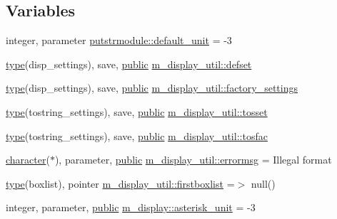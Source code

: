 \subsection*{Variables}
\begin{DoxyCompactItemize}
\item 
integer, parameter \hyperlink{namespaceputstrmodule_a7ec14945bb8449f20f21c0545b1825ee}{putstrmodule\+::default\+\_\+unit} = -\/3
\item 
\hyperlink{stop__watch_83_8txt_a70f0ead91c32e25323c03265aa302c1c}{type}(disp\+\_\+settings), save, \hyperlink{M__stopwatch_83_8txt_a2f74811300c361e53b430611a7d1769f}{public} \hyperlink{namespacem__display__util_a94e5894dfc5e8a59b6ceac6721ae4f8e}{m\+\_\+display\+\_\+util\+::defset}
\item 
\hyperlink{stop__watch_83_8txt_a70f0ead91c32e25323c03265aa302c1c}{type}(disp\+\_\+settings), save, \hyperlink{M__stopwatch_83_8txt_a2f74811300c361e53b430611a7d1769f}{public} \hyperlink{namespacem__display__util_a9ce4a22503d46c3cf4d1a054812827c0}{m\+\_\+display\+\_\+util\+::factory\+\_\+settings}
\item 
\hyperlink{stop__watch_83_8txt_a70f0ead91c32e25323c03265aa302c1c}{type}(tostring\+\_\+settings), save, \hyperlink{M__stopwatch_83_8txt_a2f74811300c361e53b430611a7d1769f}{public} \hyperlink{namespacem__display__util_a5c904147cafd4110a901207d859bdf7b}{m\+\_\+display\+\_\+util\+::tosset}
\item 
\hyperlink{stop__watch_83_8txt_a70f0ead91c32e25323c03265aa302c1c}{type}(tostring\+\_\+settings), save, \hyperlink{M__stopwatch_83_8txt_a2f74811300c361e53b430611a7d1769f}{public} \hyperlink{namespacem__display__util_a0bd80d23e6e5fec3979a3357f65fb5e3}{m\+\_\+display\+\_\+util\+::tosfac}
\item 
\hyperlink{option__stopwatch_83_8txt_abd4b21fbbd175834027b5224bfe97e66}{character}($\ast$), parameter, \hyperlink{M__stopwatch_83_8txt_a2f74811300c361e53b430611a7d1769f}{public} \hyperlink{namespacem__display__util_a844bf51463bbf006c07c60eb75a44051}{m\+\_\+display\+\_\+util\+::errormsg} = \textquotesingle{}Illegal format\textquotesingle{}
\item 
\hyperlink{stop__watch_83_8txt_a70f0ead91c32e25323c03265aa302c1c}{type}(boxlist), pointer \hyperlink{namespacem__display__util_af285f44a47c745fc4da9df4a73269ac2}{m\+\_\+display\+\_\+util\+::firstboxlist} =$>$ null()
\item 
integer, parameter, \hyperlink{M__stopwatch_83_8txt_a2f74811300c361e53b430611a7d1769f}{public} \hyperlink{namespacem__display_a9d76146cf157a888cfc94f84a8ec440f}{m\+\_\+display\+::asterisk\+\_\+unit} = -\/3

\end{DoxyCompactItemize}
